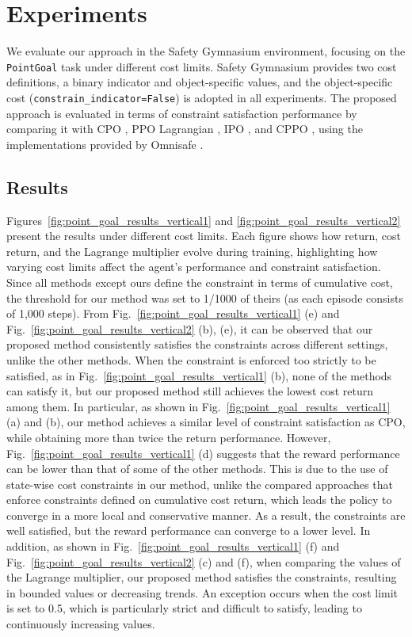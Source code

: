 \section{Experiments}

We evaluate our approach in the Safety Gymnasium \cite{ji2023safety} environment, focusing on the \texttt{PointGoal} task under different cost limits.
Safety Gymnasium provides two cost definitions, a binary indicator and object-specific values, and the object-specific cost (\texttt{constrain\_indicator=False}) is adopted in all experiments.
The proposed approach is evaluated in terms of constraint satisfaction performance by comparing it with CPO \cite{achiam2017constrained}, PPO Lagrangian \cite{ray2019benchmarking}, IPO \cite{liu2020ipo}, and CPPO \cite{stooke2020responsive}, using the implementations provided by Omnisafe \cite{ji2024omnisafe}.

\subsection{Results}

Figures~\ref{fig:point_goal_results_vertical1} and \ref{fig:point_goal_results_vertical2} present the results under different cost limits.
Each figure shows how return, cost return, and the Lagrange multiplier evolve during training, highlighting how varying cost limits affect the agent's performance and constraint satisfaction.
Since all methods except ours define the constraint in terms of cumulative cost, the threshold for our method was set to 1/1000 of theirs (as each episode consists of 1,000 steps).
From Fig.~\ref{fig:point_goal_results_vertical1} (e) and Fig.~\ref{fig:point_goal_results_vertical2} (b), (e), it can be observed that our proposed method consistently satisfies the constraints across different settings, unlike the other methods.
When the constraint is enforced too strictly to be satisfied, as in Fig.~\ref{fig:point_goal_results_vertical1} (b), none of the methods can satisfy it, but our proposed method still achieves the lowest cost return among them.
In particular, as shown in Fig.~\ref{fig:point_goal_results_vertical1} (a) and (b), our method achieves a similar level of constraint satisfaction as CPO, while obtaining more than twice the return performance.
However, Fig.~\ref{fig:point_goal_results_vertical1} (d) suggests that the reward performance can be lower than that of some of the other methods.
This is due to the use of state-wise cost constraints in our method, unlike the compared approaches that enforce constraints defined on cumulative cost return, which leads the policy to converge in a more local and conservative manner.
As a result, the constraints are well satisfied, but the reward performance can converge to a lower level.
In addition, as shown in Fig.~\ref{fig:point_goal_results_vertical1} (f) and Fig.~\ref{fig:point_goal_results_vertical2} (c) and (f), when comparing the values of the Lagrange multiplier, our proposed method satisfies the constraints, resulting in bounded values or decreasing trends.
An exception occurs when the cost limit is set to 0.5, which is particularly strict and difficult to satisfy, leading to continuously increasing values.

